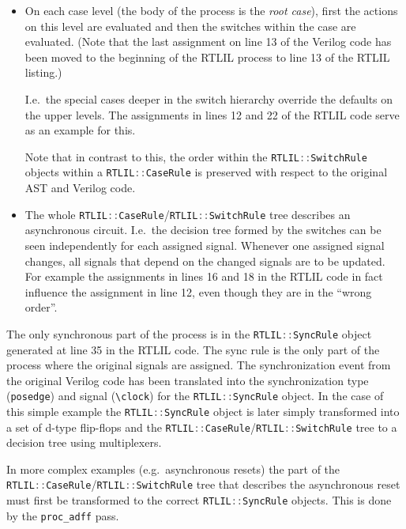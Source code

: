 \begin{itemize}
\item On each case level (the body of the process is the {\it root case}), first the actions on this level are
evaluated and then the switches within the case are evaluated. (Note that the last assignment on line 13 of the
Verilog code has been moved to the beginning of the RTLIL process to line 13 of the RTLIL listing.)

I.e.~the special cases deeper in the switch hierarchy override the defaults on the upper levels. The assignments
in lines 12 and 22 of the RTLIL code serve as an example for this.

Note that in contrast to this, the order within the \lstinline[language=C++]{RTLIL::SwitchRule} objects
within a \lstinline[language=C++]{RTLIL::CaseRule} is preserved with respect to the original AST and
Verilog code.
%
\item \begin{sloppypar}
The whole \lstinline[language=C++]{RTLIL::CaseRule}/\lstinline[language=C++]{RTLIL::SwitchRule} tree
describes an asynchronous circuit. I.e.~the decision tree formed by the switches can be seen independently for
each assigned signal. Whenever one assigned signal changes, all signals that depend on the changed signals
are to be updated. For example the assignments in lines 16 and 18 in the RTLIL code in fact influence the assignment
in line 12, even though they are in the ``wrong order''.
\end{sloppypar}
\end{itemize}

The only synchronous part of the process is in the \lstinline[language=C++]{RTLIL::SyncRule} object generated at line
35 in the RTLIL code. The sync rule is the only part of the process where the original signals are assigned. The
synchronization event from the original Verilog code has been translated into the synchronization type ({\tt posedge})
and signal ({\tt \textbackslash clock}) for the \lstinline[language=C++]{RTLIL::SyncRule} object. In the case of
this simple example the \lstinline[language=C++]{RTLIL::SyncRule} object is later simply transformed into a set of
d-type flip-flops and the \lstinline[language=C++]{RTLIL::CaseRule}/\lstinline[language=C++]{RTLIL::SwitchRule} tree
to a decision tree using multiplexers.

\begin{sloppypar}
In more complex examples (e.g.~asynchronous resets) the part of the
\lstinline[language=C++]{RTLIL::CaseRule}/\lstinline[language=C++]{RTLIL::SwitchRule}
tree that describes the asynchronous reset must first be transformed to the
correct \lstinline[language=C++]{RTLIL::SyncRule} objects. This is done by the {\tt proc\_adff} pass.
\end{sloppypar}

